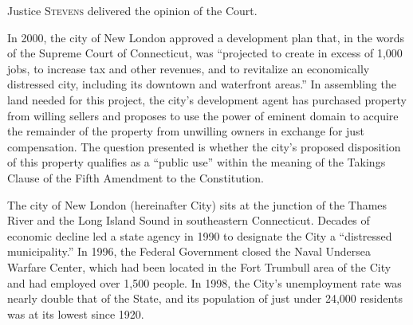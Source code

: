 

\opinion Justice \textsc{Stevens} delivered the opinion of the Court.

In 2000, the city of New London approved a development plan that, in the words
of the Supreme Court of Connecticut, was ``projected to create in excess of
1,000 jobs, to increase tax and other revenues, and to revitalize an
economically distressed city, including its downtown and waterfront areas.'' In
assembling the land needed for this project, the city's development agent has
purchased property from willing sellers and proposes to use the power of eminent
domain to acquire the remainder of the property from unwilling owners in
exchange for just compensation. The question presented is whether the city's
proposed disposition of this property qualifies as a ``public use'' within the
meaning of the Takings Clause of the Fifth Amendment to the Constitution.



The city of New London (hereinafter City) sits at the junction of the Thames
River and the Long Island Sound in southeastern Connecticut. Decades of economic
decline led a state agency in 1990 to designate the City a ``distressed
municipality.'' In 1996, the Federal Government closed the Naval Undersea
Warfare Center, which had been located in the Fort Trumbull area of the City and
had employed over 1,500 people. In 1998, the City's unemployment rate was nearly
double that of the State, and its population of just under 24,000 residents was
at its lowest since 1920.


